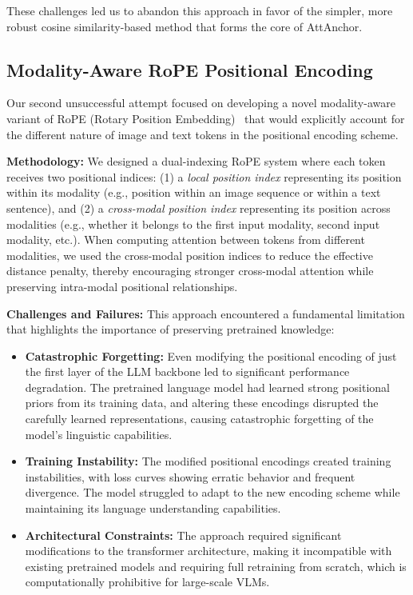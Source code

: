 \documentclass[11pt]{article}
\begin{document}
These challenges led us to abandon this approach in favor of the simpler, more robust cosine similarity-based method that forms the core of AttAnchor.

\subsection{Modality-Aware RoPE Positional Encoding}

Our second unsuccessful attempt focused on developing a novel modality-aware variant of RoPE (Rotary Position Embedding)~\citep{su2024roformer} that would explicitly account for the different nature of image and text tokens in the positional encoding scheme.

\textbf{Methodology:} We designed a dual-indexing RoPE system where each token receives two positional indices: (1) a \textit{local position index} representing its position within its modality (e.g., position within an image sequence or within a text sentence), and (2) a \textit{cross-modal position index} representing its position across modalities (e.g., whether it belongs to the first input modality, second input modality, etc.). When computing attention between tokens from different modalities, we used the cross-modal position indices to reduce the effective distance penalty, thereby encouraging stronger cross-modal attention while preserving intra-modal positional relationships.

\textbf{Challenges and Failures:} This approach encountered a fundamental limitation that highlights the importance of preserving pretrained knowledge:

\begin{itemize}
\item \textbf{Catastrophic Forgetting:} Even modifying the positional encoding of just the first layer of the LLM backbone led to significant performance degradation. The pretrained language model had learned strong positional priors from its training data, and altering these encodings disrupted the carefully learned representations, causing catastrophic forgetting of the model's linguistic capabilities.

\item \textbf{Training Instability:} The modified positional encodings created training instabilities, with loss curves showing erratic behavior and frequent divergence. The model struggled to adapt to the new encoding scheme while maintaining its language understanding capabilities.

\item \textbf{Architectural Constraints:} The approach required significant modifications to the transformer architecture, making it incompatible with existing pretrained models and requiring full retraining from scratch, which is computationally prohibitive for large-scale VLMs.
\end{itemize}
\end{document}
